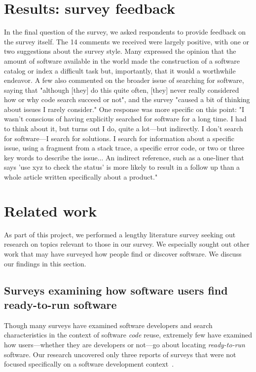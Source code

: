 \documentclass{casicswhitepaper}
\begin{document}
\section{Results: survey feedback}

In the final question of the survey, we asked respondents to provide feedback on the survey itself.  The 14 comments we received were largely positive, with one or two suggestions about the survey style. Many expressed the opinion that the amount of software available in the world made the construction of a software catalog or index a difficult task but, importantly, that it would a worthwhile endeavor. A few also commented on the broader issue of searching for software, saying that "although [they] do this quite often, [they] never really considered how or why code search succeed or not", and the survey "caused a bit of thinking about issues I rarely consider." One response was more specific on this point: "I wasn't conscious of having explicitly searched for software for a long time. I had to think about it, but turns out I do, quite a lot---but indirectly. I don't search for software---I search for solutions. I search for information about a specific issue, using a fragment from a stack trace, a specific error code, or two or three key words to describe the issue... An indirect reference, such as a one-liner that says 'use xyz to check the status' is more likely to result in a follow up than a whole article written specifically about a product."


\section{Related work}

As part of this project, we performed a lengthy literature survey seeking out research on topics relevant to those in our survey.  We especially sought out other work that may have surveyed how people find or discover software.  We discuss our findings in this section.


\subsection{Surveys examining how software users find ready-to-run software}

Though many surveys have examined software developers and search characteristics in the context of software \emph{code} reuse, extremely few have examined how users---whether they are developers or not---go about locating \emph{ready-to-run} software.  Our research uncovered only three reports of surveys that were not focused specifically on a software development context~\cite{joppa2013troubling, huang2013provenance, lawrence2015science}.
\end{document}

